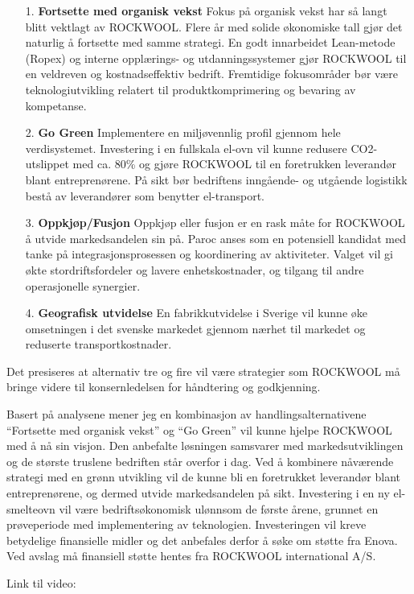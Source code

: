 \begin{itemize}
\item[1.]\textbf{Fortsette med organisk vekst}
\indent \newline
Fokus på organisk vekst har så langt blitt vektlagt av ROCKWOOL. Flere år med solide økonomiske tall gjør det naturlig å fortsette med samme strategi. En godt innarbeidet Lean-metode (Ropex) og interne opplærings- og utdanningssystemer gjør ROCKWOOL til en veldreven og kostnadseffektiv bedrift. Fremtidige fokusområder bør være teknologiutvikling relatert til produktkomprimering og bevaring av kompetanse. 

\item[2.]\textbf{Go Green}
\indent \newline
Implementere en miljøvennlig profil gjennom hele verdisystemet. Investering i en fullskala el-ovn vil kunne redusere CO2-utslippet med ca. 80\% og gjøre ROCKWOOL til en foretrukken leverandør blant entreprenørene. På sikt bør bedriftens inngående- og utgående logistikk bestå av leverandører som benytter el-transport.

\item[3.]\textbf{Oppkjøp/Fusjon}
\indent \newline
Oppkjøp eller fusjon er en rask måte for ROCKWOOL å utvide markedsandelen sin på. Paroc anses som en potensiell kandidat med tanke på integrasjonsprosessen og koordinering av aktiviteter. Valget vil gi økte stordriftsfordeler og lavere enhetskostnader, og tilgang til andre operasjonelle synergier.

\item[4.]\textbf{Geografisk utvidelse}
\indent \newline
En fabrikkutvidelse i Sverige vil kunne øke omsetningen i det svenske markedet gjennom nærhet til markedet og reduserte transportkostnader.
\end{itemize}
\indent
Det presiseres at alternativ tre og fire vil være strategier som ROCKWOOL må bringe videre til konsernledelsen for håndtering og godkjenning.

\indent \newline
Basert på analysene mener jeg en kombinasjon av handlingsalternativene “Fortsette med organisk vekst” og “Go Green” vil kunne hjelpe ROCKWOOL med å nå sin visjon. Den anbefalte løsningen samsvarer med markedsutviklingen og de største truslene bedriften står overfor i dag. Ved å kombinere nåværende strategi med en grønn utvikling vil de kunne bli en foretrukket leverandør blant entreprenørene, og dermed utvide markedsandelen på sikt. Investering i en ny el-smelteovn vil være bedriftsøkonomisk ulønnsom de første årene, grunnet en prøveperiode med implementering av teknologien. Investeringen vil kreve betydelige finansielle midler og det anbefales derfor å søke om støtte fra Enova. Ved avslag må finansiell støtte hentes fra ROCKWOOL international A/S. 

\indent \newline
Link til video: 
